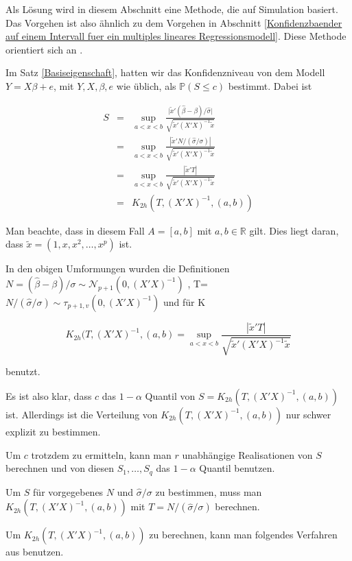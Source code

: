 \documentclass[12pt,a4paper]{article}
\theoremstyle{definition}
\theoremstyle{definition}
\theoremstyle{definition}
\theoremstyle{definition}
\begin{document}
Als Lösung wird in diesem Abschnitt eine Methode, die auf Simulation basiert. Das Vorgehen ist also ähnlich zu dem Vorgehen in Abschnitt \ref{Konfidenzbaender auf einem Intervall fuer ein multiples lineares Regressionsmodell}. Diese Methode orientiert sich an \cite[183,184]{Liu64}.

Im Satz \ref{Basiseigenschaft}, hatten wir das Konfidenzniveau von dem Modell $Y=X\beta+e$, mit $Y,X,\beta,e$ wie üblich, als $\mathbb{P}(S \leq c)$ bestimmt. Dabei ist

\begin{eqnarray*}
S &=& \sup_{a<x<b} \frac{\vert \tilde{x}'(\hat{\beta}-\beta) /\hat{\sigma} \vert}{\sqrt{\tilde{x}'(X'X)^{-1}\tilde{x}}} \\
&=& \sup_{a<x<b} \frac{|\tilde{x}'N/(\hat{\sigma}/\sigma)|}{\sqrt{\tilde{x}'(X'X)^{-1}\tilde{x}}} \\
&=& \sup_{a<x<b} \frac{| \tilde{x}'T |}{\sqrt{\tilde{x}'(X'X)^{-1}\tilde{x}}} \\
&=& K_{2h}(T,(X'X)^{-1},(a,b))
\end{eqnarray*}

Man beachte, dass in diesem Fall $A=[a,b]$ mit $a,b \in \mathbb{R}$ gilt. Dies liegt daran, dass $\tilde{x} = (1, x, x^2, \ldots, x^p)$ ist.

In den obigen Umformungen wurden die Definitionen $ N=(\hat{\beta}-\beta)/\sigma \sim \mathscr{N}_{p+1
} (0,(X'X)^{-1}) $ , \gls{T}=$N/(\hat{\sigma}/\sigma)\sim\tau_{p+1,v}(0,(X'X)^{-1}) $ und für \gls{K}

\begin{equation*}
K_{2h}(T,(X'X)^{-1},(a,b) = \sup_{a<x<b} \frac{|\tilde{x}'T|}{\sqrt{\tilde{x}'(X'X)^{-1}\tilde{x}}}
\end{equation*}

benutzt.

Es ist also klar, dass $c$ das $1-\alpha$ Quantil von $S = K_{2h}(T,(X'X)^{-1},(a,b))$ ist. Allerdings ist die Verteilung von $K_{2h}(T,(X'X)^{-1},(a,b))$ nur schwer explizit zu bestimmen.

Um $c$ trotzdem zu ermitteln, kann man $r$ unabhängige Realisationen von $S$ berechnen und von diesen $S_1, \ldots, S_q$ das $1-\alpha$ Quantil benutzen.

Um $S$ für vorgegebenes $N$ und $\hat{\sigma}/\sigma$ zu bestimmen, muss man $K_{2h}(T,(X'X)^{-1},(a,b))$ mit $T=N/(\hat{\sigma}/\sigma)$ berechnen. 

Um  $K_{2h}(T,(X'X)^{-1},(a,b))$ zu berechnen, kann man folgendes Verfahren aus \cite[Appendix E]{Liu64}  benutzen.
\end{document}
